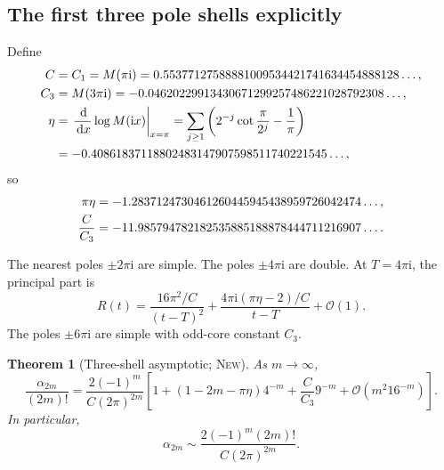 \documentclass[11pt,oneside]{article}
\theoremstyle{frontier}
\newtheorem{theorem}{Theorem}[section]
\theoremstyle{definition}
\theoremstyle{remark}
\newcommand{\ii}{\mathrm i}
\newcommand{\dd}{\,\mathrm d}
\newcommand{\BigO}{\mathcal O}
\newcommand{\statusnew}{\textsc{New}}
\begin{document}
\subsection{The first three pole shells explicitly}

Define
\begin{align}
 C&=C_1=M(\pi\ii)
 =0.55377127588881009534421741634454888128\ldots,
 \label{eq:C-value}\\
 C_3&=M(3\pi\ii)
 =-0.04620229913430671299257486221028792308\ldots,
 \label{eq:C3-value}\\
 \eta&=\left.\frac{\dd}{\dd x}\log M(\ii x)\right|_{x=\pi}
 =\sum_{j\ge1}\left(2^{-j}\cot\frac{\pi}{2^j}-\frac1\pi\right)
 \notag\\
 &=-0.40861837118802483147907598511740221545\ldots,
 \label{eq:eta-value}
\end{align}
so
\begin{align}
 \pi\eta
 &=-1.2837124730461260445945438959726042474\ldots,\notag\\
 \frac{C}{C_3}
 &=-11.985794782182535885188878444711216907\ldots.
 \label{eq:eta-ratio-values}
\end{align}

The nearest poles $\pm2\pi\ii$ are simple.  The poles $\pm4\pi\ii$ are double.  At
$T=4\pi\ii$, the principal part is
\begin{equation}
 R(t)=\frac{16\pi^2/C}{(t-T)^2}
 +\frac{4\pi\ii(\pi\eta-2)/C}{t-T}+\BigO(1).
 \label{eq:double-pole-principal}
\end{equation}
The poles $\pm6\pi\ii$ are simple with odd-core constant $C_3$.

\begin{theorem}[Three-shell asymptotic; \statusnew]
\label{thm:three-shell}
As $m\to\infty$,
\begin{equation}
 \boxed{
 \frac{\alpha_{2m}}{(2m)!}
 =\frac{2(-1)^m}{C(2\pi)^{2m}}
 \left[
 1+(1-2m-\pi\eta)4^{-m}
 +\frac{C}{C_3}9^{-m}
 +\BigO\!\left(m^2 16^{-m}\right)
 \right].
 }
 \label{eq:alpha-three-shell}
\end{equation}
In particular,
\begin{equation}
 \alpha_{2m}
 \sim \frac{2(-1)^m(2m)!}{C(2\pi)^{2m}}.
 \label{eq:alpha-leading-asymptotic}
\end{equation}
\end{theorem}
\end{document}

